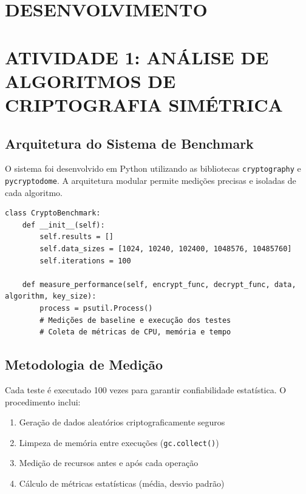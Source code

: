 \documentclass[12pt,a4paper,oneside]{article}
\begin{document}
\section{DESENVOLVIMENTO}

\section{ATIVIDADE 1: ANÁLISE DE ALGORITMOS DE CRIPTOGRAFIA SIMÉTRICA}

\subsection{Arquitetura do Sistema de Benchmark}

O sistema foi desenvolvido em Python utilizando as bibliotecas \texttt{cryptography} e \texttt{pycryptodome}. A arquitetura modular permite medições precisas e isoladas de cada algoritmo.

\begin{lstlisting}[caption=Estrutura principal da classe CryptoBenchmark]
class CryptoBenchmark:
    def __init__(self):
        self.results = []
        self.data_sizes = [1024, 10240, 102400, 1048576, 10485760]
        self.iterations = 100
    
    def measure_performance(self, encrypt_func, decrypt_func, data, algorithm, key_size):
        process = psutil.Process()
        # Medições de baseline e execução dos testes
        # Coleta de métricas de CPU, memória e tempo
\end{lstlisting}

\subsection{Metodologia de Medição}

Cada teste é executado 100 vezes para garantir confiabilidade estatística. O procedimento inclui:

\begin{enumerate}
    \item Geração de dados aleatórios criptograficamente seguros
    \item Limpeza de memória entre execuções (\texttt{gc.collect()})
    \item Medição de recursos antes e após cada operação
    \item Cálculo de métricas estatísticas (média, desvio padrão)
\end{enumerate}
\end{document}

